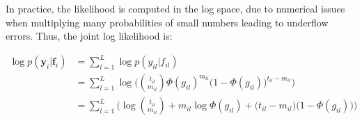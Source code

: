 In practice, the likelihood is computed in the log space, due to numerical issues when multiplying many probabilities of small numbers leading to underflow errors. Thus, the joint log likelihood is:

\begin{equation} \label{likel-binom-prob-f}
  \begin{split}
	\log p(\mathbf{y}_{i}|\mathbf{f}_{i}) & = \sum_{l=1}^{L} \log p(y_{il}|f_{il}) \\
				& = \sum_{l=1}^{L} \log \bigg(\binom{t_{il}}{m_{il}} \Phi(g_{il})^{m_{il}} \big(1 - \Phi(g_{il})\big)^{t_{il} - m_{il}}\bigg) \\
				& = \sum_{l=1}^{L} \bigg(\log \binom{t_{il}}{m_{il}} + m_{il} \log \Phi(g_{il}) + \big(t_{il} - m_{il} \big) \big(1 - \Phi(g_{il})\big)\bigg)
  \end{split}
\end{equation}